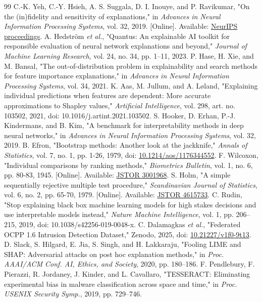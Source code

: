 \documentclass[conference,letterpaper]{IEEEtran}
\begin{document}
\begin{thebibliography}{99}
 C.-K. Yeh, C.-Y. Hsieh, A. S. Suggala, D. I. Inouye, and P. Ravikumar, "On the (in)fidelity and sensitivity of explanations," in \emph{Advances in Neural Information Processing Systems}, vol. 32, 2019. [Online]. Available: \href{https://proceedings.neurips.cc/paper/2019/hash/a7471fdc77b3435276507cc8f2dc2569-Abstract.html}{NeurIPS proceedings}.
 A. Hedstr\"om \emph{et al.}, "Quantus: An explainable AI toolkit for responsible evaluation of neural network explanations and beyond," \emph{Journal of Machine Learning Research}, vol. 24, no. 34, pp. 1--11, 2023.
 P. Hase, H. Xie, and M. Bansal, "The out-of-distribution problem in explainability and search methods for feature importance explanations," in \emph{Advances in Neural Information Processing Systems}, vol. 34, 2021.
 K. Aas, M. Jullum, and A. L\o land, "Explaining individual predictions when features are dependent: More accurate approximations to Shapley values," \emph{Artificial Intelligence}, vol. 298, art. no. 103502, 2021, doi: 10.1016/j.artint.2021.103502.
 S. Hooker, D. Erhan, P.-J. Kindermans, and B. Kim, "A benchmark for interpretability methods in deep neural networks," in \emph{Advances in Neural Information Processing Systems}, vol. 32, 2019.
 B. Efron, "Bootstrap methods: Another look at the jackknife," \emph{Annals of Statistics}, vol. 7, no. 1, pp. 1-26, 1979, doi: \href{https://doi.org/10.1214/aos/1176344552}{10.1214/aos/1176344552}.
 F. Wilcoxon, "Individual comparisons by ranking methods," \emph{Biometrics Bulletin}, vol. 1, no. 6, pp. 80-83, 1945. [Online]. Available: \href{https://www.jstor.org/stable/3001968}{JSTOR 3001968}.
 S. Holm, "A simple sequentially rejective multiple test procedure," \emph{Scandinavian Journal of Statistics}, vol. 6, no. 2, pp. 65-70, 1979. [Online]. Available: \href{https://www.jstor.org/stable/4615733}{JSTOR 4615733}.
 C. Rudin, "Stop explaining black box machine learning models for high stakes decisions and use interpretable models instead," \emph{Nature Machine Intelligence}, vol. 1, pp. 206--215, 2019, doi: 10.1038/s42256-019-0048-x.
 C. Dalamagkas \emph{et al.}, "Federated OCPP 1.6 Intrusion Detection Dataset," Zenodo, 2025, doi: \href{https://doi.org/10.21227/v1f0-9t13}{10.21227/v1f0-9t13}.
 D. Slack, S. Hilgard, E. Jia, S. Singh, and H. Lakkaraju, "Fooling LIME and SHAP: Adversarial attacks on post hoc explanation methods," in \emph{Proc. AAAI/ACM Conf. AI, Ethics, and Society}, 2020, pp. 180--186.
 F. Pendlebury, F. Pierazzi, R. Jordaney, J. Kinder, and L. Cavallaro, "TESSERACT: Eliminating experimental bias in malware classification across space and time," in \emph{Proc. USENIX Security Symp.}, 2019, pp. 729--746.
\end{thebibliography}
\end{document}
